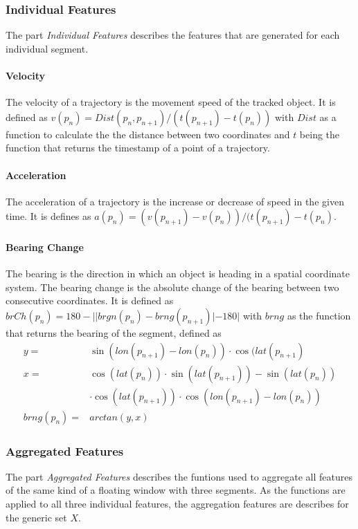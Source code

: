 \subsubsection{Individual Features}
The part \textit{Individual Features} describes the features that are generated for each individual segment. 

\paragraph{Velocity} The velocity of a trajectory is the movement speed of the tracked object. It is defined as $v(p_n) = Dist(p_n, p_{n+1})/(t(p_{n+1}) - t(p_n))$ with $Dist$ as a function to calculate the the distance between two coordinates and $t$ being the function that returns the timestamp of a point of a trajectory. \cite{Zheng2008}

\paragraph{Acceleration} The acceleration of a trajectory is the increase or decrease of speed in the given time. It is defines as $ a(p_n) = (v(p_{n+1}) - v(p_n))/(t(p_{n+1}) - t(p_n)$. \cite{Zheng2008}

\paragraph{Bearing Change} The bearing is the direction in which an object is heading in a spatial coordinate system. The bearing change is the absolute change of the bearing between two consecutive coordinates. It is defined as $ brCh(p_n) = 180 - | |brgn(p_n) - brng(p_{n+1})
| - 180| $ with $brng$ as the function that returns the bearing of the segment, defined as 
\begin{align*}
            y =& \sin (lon(p_{n+1})-lon(p_n)) \cdot \cos(lat(p_{n+1}) \\ 
            x =& \cos (lat(p_n)) \cdot \sin (lat(p_{n+1}))-\sin (lat(p_n))\\
               & \cdot \cos (lat(p_{n+1})) \cdot \cos(lon(p_{n+1})-lon(p_n)) \\
    brng(p_n) =& arctan(y,x)
\end{align*} \cite{Dabiri2018}

\subsubsection{Aggregated Features}
The part \textit{Aggregated Features} describes the funtions used to aggregate all features of the same kind of a floating window with three segments. As the functions are applied to all three individual features, the aggregation features are describes for the generic set $X$.

